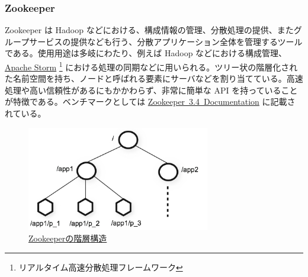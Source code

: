 \documentclass{scrartcl}
\begin{document}
\subsubsection{Zookeeper}
\label{sec:org8b035c8}
Zookeeper は Hadoop などにおける、構成情報の管理、分散処理の提供、またグループサービスの提供なども行う、分散アプリケーション全体を管理するツールである。使用用途は多岐にわたり、例えば Hadoop などにおける構成管理、 \href{http://storm.apache.org/}{Apache Storm}\textsuperscript{\texttrademark} \footnote{リアルタイム高速分散処理フレームワーク} における処理の同期などに用いられる。ツリー状の階層化された名前空間を持ち、ノードと呼ばれる要素にサーバなどを割り当てている。高速処理や高い信頼性があるにもかかわらず、非常に簡単な API を持っていることが特徴である。ベンチマークとしては \href{http://zookeeper.apache.org/doc/current/zookeeperOver.html#fg_zkPerfRW}{Zookeeper\ 3.4\ Documentation} に記載されている。\\


\begin{figure}[htbp]
\centering
\includegraphics[width=8cm]{./zknamespace.jpg}
\caption{\href{http://zookeeper.apache.org/doc/current/zookeeperOver.html\#fg_zkPerfRW}{Zookeeperの階層構造}}
\end{figure}

\newpage
\end{document}
